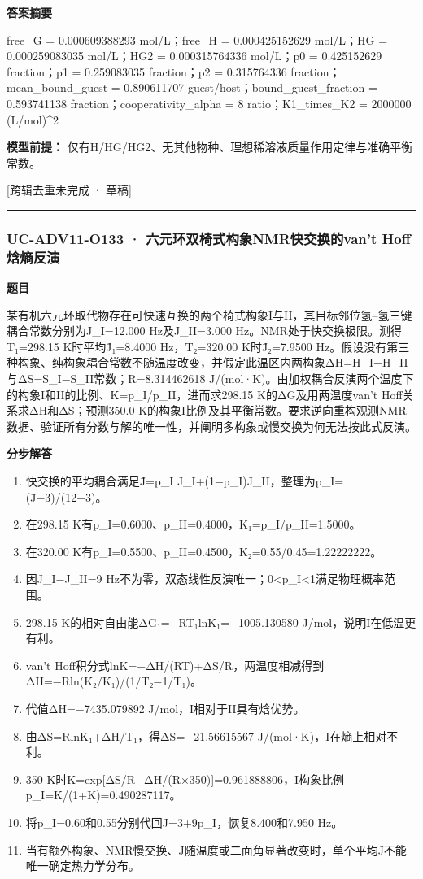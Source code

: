 \documentclass[UTF8,11pt,a4paper]{ctexart}
\begin{document}
\noindent\textbf{答案摘要}\par
free\_G = 0.000609388293 mol/L；free\_H = 0.000425152629 mol/L；HG = 0.000259083035 mol/L；HG2 = 0.000315764336 mol/L；p0 = 0.425152629 fraction；p1 = 0.259083035 fraction；p2 = 0.315764336 fraction；mean\_bound\_guest = 0.890611707 guest/host；bound\_guest\_fraction = 0.593741138 fraction；cooperativity\_alpha = 8 ratio；K1\_times\_K2 = 2000000 (L/mol)\textasciicircum{}2\par
\noindent\textbf{模型前提：}
仅有H/HG/HG2、无其他物种、理想稀溶液质量作用定律与准确平衡常数。\par
\noindent\textcolor{red!65!black}{[跨辑去重未完成 · 草稿]} \par
\medskip\hrule\medskip
{}
\subsubsection*{UC-ADV11-O133 · 六元环双椅式构象NMR快交换的van’t Hoff焓熵反演}
\noindent\textbf{题目}\par
某有机六元环取代物存在可快速互换的两个椅式构象I与II，其目标邻位氢–氢三键耦合常数分别为J\_I=12.000 Hz及J\_II=3.000 Hz。NMR处于快交换极限。测得T₁=298.15 K时平均J̄₁=8.4000 Hz，T₂=320.00 K时J̄₂=7.9500 Hz。假设没有第三种构象、纯构象耦合常数不随温度改变，并假定此温区内两构象ΔH=H\_I−H\_II与ΔS=S\_I−S\_II常数；R=8.314462618 J/(mol·K)。由加权耦合反演两个温度下的构象I和II的比例、K=p\_I/p\_II，进而求298.15 K的ΔG及用两温度van’t Hoff关系求ΔH和ΔS；预测350.0 K的构象I比例及其平衡常数。要求逆向重构观测NMR数据、验证所有分数与解的唯一性，并阐明多构象或慢交换为何无法按此式反演。\par
\medskip\noindent\textbf{分步解答}
\begin{enumerate}
\item 快交换的平均耦合满足J̄=p\_I J\_I+(1−p\_I)J\_II，整理为p\_I=(J̄−3)/(12−3)。
\item 在298.15 K有p\_I=0.6000、p\_II=0.4000，K₁=p\_I/p\_II=1.5000。
\item 在320.00 K有p\_I=0.5500、p\_II=0.4500，K₂=0.55/0.45=1.22222222。
\item 因J\_I−J\_II=9 Hz不为零，双态线性反演唯一；0<p\_I<1满足物理概率范围。
\item 298.15 K的相对自由能ΔG₁=−RT₁lnK₁=−1005.130580 J/mol，说明I在低温更有利。
\item van’t Hoff积分式lnK=−ΔH/(RT)+ΔS/R，两温度相减得到ΔH=−Rln(K₂/K₁)/(1/T₂−1/T₁)。
\item 代值ΔH=−7435.079892 J/mol，I相对于II具有焓优势。
\item 由ΔS=RlnK₁+ΔH/T₁，得ΔS=−21.56615567 J/(mol·K)，I在熵上相对不利。
\item 350 K时K=exp[ΔS/R−ΔH/(R×350)]=0.961888806，I构象比例p\_I=K/(1+K)=0.490287117。
\item 将p\_I=0.60和0.55分别代回J̄=3+9p\_I，恢复8.400和7.950 Hz。
\item 当有额外构象、NMR慢交换、J随温度或二面角显著改变时，单个平均J不能唯一确定热力学分布。
\end{enumerate}
\end{document}
